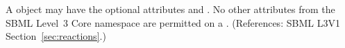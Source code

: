 A \KineticLaw object may have the optional attributes  and
.  No other attributes from the SBML Level~3 Core namespace
are permitted on a \KineticLaw.  (References: SBML L3V1
Section~\ref{sec:reactions}.)
